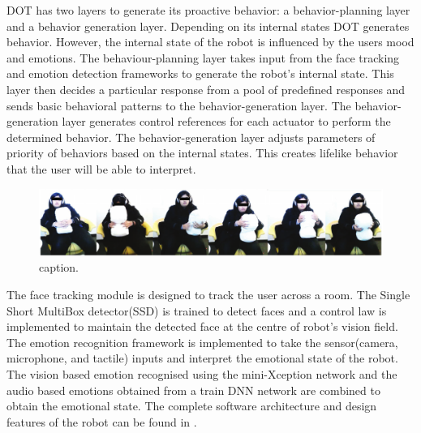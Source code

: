 \documentclass[letterpaper, 10 pt, conference]{ieeeconf}  %
\begin{document}
DOT has two layers to generate its proactive behavior: a behavior-planning layer and a behavior generation layer. Depending on its internal states DOT generates behavior. However, the internal state of the robot is influenced by the users mood and emotions. The behaviour-planning layer takes input from the face tracking and emotion detection frameworks to generate the robot's internal state. This layer then decides a particular response from a pool of predefined responses and sends basic behavioral patterns to the behavior-generation layer. The behavior-generation layer generates control references for each actuator to perform the determined behavior. The behavior-generation layer adjusts parameters of priority of behaviors based on the internal states. This creates lifelike behavior that the user will be able to interpret.

\begin{figure}[t!]
\centering
\includegraphics[width=\textwidth]{pilot-data.pdf}
\vskip -10pt
\caption{caption.}
\label{fig:pilot-study}
\end{figure}




The face tracking module is designed to track the user across a room. The Single Short MultiBox detector(SSD) is trained to detect faces and a control law is implemented to maintain the detected face at the centre of robot's vision field. The emotion recognition framework is implemented to take the sensor(camera, microphone, and tactile) inputs and interpret the emotional state of the robot. The vision based emotion recognised using the mini-Xception network and the audio based emotions obtained from a train DNN network are combined to obtain the emotional state. The complete software architecture and design features of the robot can be found in \cite{r4}. 
\end{document}
